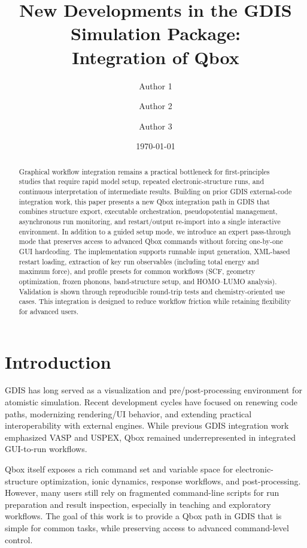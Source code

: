 \documentclass[11pt,a4paper]{article}
\title{New Developments in the GDIS Simulation Package:\\Integration of Qbox}
\author{Author 1 \and Author 2 \and Author 3}
\date{\today}
\begin{document}
\maketitle

\begin{abstract}
Graphical workflow integration remains a practical bottleneck for first-principles studies that require rapid model setup, repeated electronic-structure runs, and continuous interpretation of intermediate results.
Building on prior GDIS external-code integration work, this paper presents a new Qbox integration path in GDIS that combines structure export, executable orchestration, pseudopotential management, asynchronous run monitoring, and restart/output re-import into a single interactive environment.
In addition to a guided setup mode, we introduce an expert pass-through mode that preserves access to advanced Qbox commands without forcing one-by-one GUI hardcoding.
The implementation supports runnable input generation, XML-based restart loading, extraction of key run observables (including total energy and maximum force), and profile presets for common workflows (SCF, geometry optimization, frozen phonons, band-structure setup, and HOMO--LUMO analysis).
Validation is shown through reproducible round-trip tests and chemistry-oriented use cases.
This integration is designed to reduce workflow friction while retaining flexibility for advanced users.
\end{abstract}

\section{Introduction}
GDIS has long served as a visualization and pre/post-processing environment for atomistic simulation.
Recent development cycles have focused on renewing code paths, modernizing rendering/UI behavior, and extending practical interoperability with external engines.
While previous GDIS integration work emphasized VASP and USPEX, Qbox remained underrepresented in integrated GUI-to-run workflows.

Qbox itself exposes a rich command set and variable space for electronic-structure optimization, ionic dynamics, response workflows, and post-processing.
However, many users still rely on fragmented command-line scripts for run preparation and result inspection, especially in teaching and exploratory workflows.
The goal of this work is to provide a Qbox path in GDIS that is simple for common tasks, while preserving access to advanced command-level control.
\end{document}
